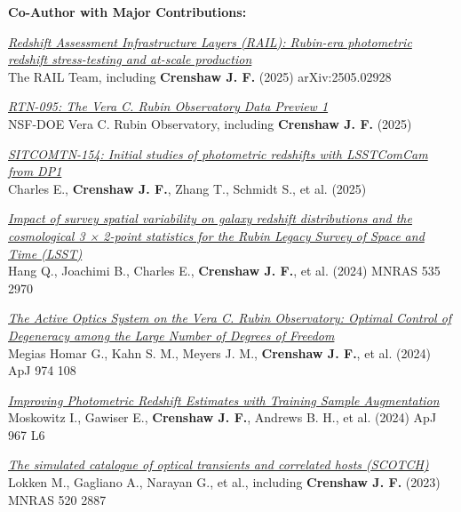 \textbf{Co-Author with Major Contributions:}
\begin{etaremune}
\item \href{https://ui.adsabs.harvard.edu/abs/2025arXiv250502928T}{\textit{Redshift Assessment Infrastructure Layers (RAIL): Rubin-era photometric redshift stress-testing and at-scale production}} \\ 
The RAIL Team, including \textbf{Crenshaw J. F.} (2025) 
arXiv:2505.02928 

\item \href{https://ui.adsabs.harvard.edu/abs/2025rubn.rept...31N}{\textit{RTN-095: The Vera C. Rubin Observatory Data Preview 1}} \\ 
NSF-DOE Vera C. Rubin Observatory, including \textbf{Crenshaw J. F.} (2025) 

\item \href{https://ui.adsabs.harvard.edu/abs/2025rubn.rept...35C}{\textit{SITCOMTN-154: Initial studies of photometric redshifts with LSSTComCam from DP1}} \\ 
Charles E., \textbf{Crenshaw J. F.}, Zhang T., Schmidt S., et al. (2025) 

\item \href{https://ui.adsabs.harvard.edu/abs/2024MNRAS.535.2970H}{\textit{Impact of survey spatial variability on galaxy redshift distributions and the cosmological 3 × 2-point statistics for the Rubin Legacy Survey of Space and Time (LSST)}} \\ 
Hang Q., Joachimi B., Charles E., \textbf{Crenshaw J. F.}, et al. (2024) 
MNRAS 535 2970 

\item \href{https://ui.adsabs.harvard.edu/abs/2024ApJ...974..108M}{\textit{The Active Optics System on the Vera C. Rubin Observatory: Optimal Control of Degeneracy among the Large Number of Degrees of Freedom}} \\ 
Megias Homar G., Kahn S. M., Meyers J. M., \textbf{Crenshaw J. F.}, et al. (2024) 
ApJ 974 108 

\item \href{https://ui.adsabs.harvard.edu/abs/2024ApJ...967L...6M}{\textit{Improving Photometric Redshift Estimates with Training Sample Augmentation}} \\ 
Moskowitz I., Gawiser E., \textbf{Crenshaw J. F.}, Andrews B. H., et al. (2024) 
ApJ 967 L6 

\item \href{https://ui.adsabs.harvard.edu/abs/2023MNRAS.520.2887L}{\textit{The simulated catalogue of optical transients and correlated hosts (SCOTCH)}} \\ 
Lokken M., Gagliano A., Narayan G., et al., including \textbf{Crenshaw J. F.} (2023) 
MNRAS 520 2887 


\end{etaremune}
